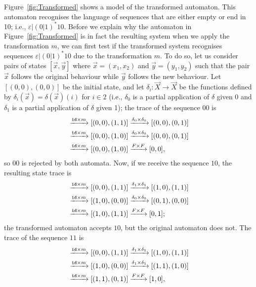 Figure~\ref{fig:Transformed} shows a model of the transformed automaton. This automaton recognises the language of sequences that are either empty or end in 10; i.e., $\varepsilon|(0|1)^*10$. 
Before we explain why the automaton in Figure~\ref{fig:Transformed} is in fact the resulting system when we apply the transformation $m$, we can first test if the transformed system recognises sequences $\varepsilon|(0|1)^*10$ due to the transformation $m$. %
To do so, let us consider pairs of states $[\vec{x},\vec{y}]$ where $\vec{x}=(x_1,x_2)$ and $\vec{y}=(y_1,y_2)$ such that the pair $\vec{x}$ follows the original behaviour while $\vec{y}$ follows the new behaviour. 
Let $[(0,0),(0,0)]$ be the initial state, and let $\delta_i\colon \vec{X}\rightarrow \vec{X}$ be the functions defined by $\delta_i(\vec{x})=\delta(\vec{x})(i)$ for $i \in 2$ (i.e., $\delta_0$ is a partial application of $\delta$ given $0$ and $\delta_1$ is a partial application of $\delta$ given 1); %
the trace of the sequence $00$ is 
\begin{align*}
   [(0,0),(0,0)]&\xrightarrow{\id\times m}[(0,0),(1,1)]\xrightarrow{\delta_0\times\delta_0}[(0,0),(0,1)]\\
   &\xrightarrow{\id\times m}[(0,0),(1,0)]\xrightarrow{\delta_0\times\delta_0}[(0,0),(0,1)]\\
   &\xrightarrow{\id\times m}[(0,0),(1,0)]\xrightarrow{F\times F}[0,0],
\end{align*}
so $00$ is rejected by both automata. 
Now, if we receive the sequence $10$, the resulting state trace is 
\begin{align*}
    [(0,0),(0,0)]&\xrightarrow{\id\times m}[(0,0),(1,1)]\xrightarrow{\delta_1\times\delta_1}[(1,0),(1,1)]\\
   &\xrightarrow{\id\times m}[(1,0),(0,0)]\xrightarrow{\delta_0\times\delta_0}[(0,1),(0,0)]\\
   &\xrightarrow{\id\times m}[(1,0),(1,1)]\xrightarrow{F\times F}[0,1];
\end{align*}
the transformed automaton accepts $10$, but the original automaton does not. 
The trace of the sequence $11$ is 
\begin{align*}
    [(0,0),(0,0)]&\xrightarrow{\id\times m}[(0,0),(1,1)]\xrightarrow{\delta_1\times\delta_1}[(1,0),(1,1)]\\
   &\xrightarrow{\id\times m}[(1,0),(0,0)]\xrightarrow{\delta_1\times\delta_1}[(1,1),(1,0)]\\
   &\xrightarrow{\id\times m}[(1,1),(0,1)]\xrightarrow{F\times F}[1,0],
\end{align*}
